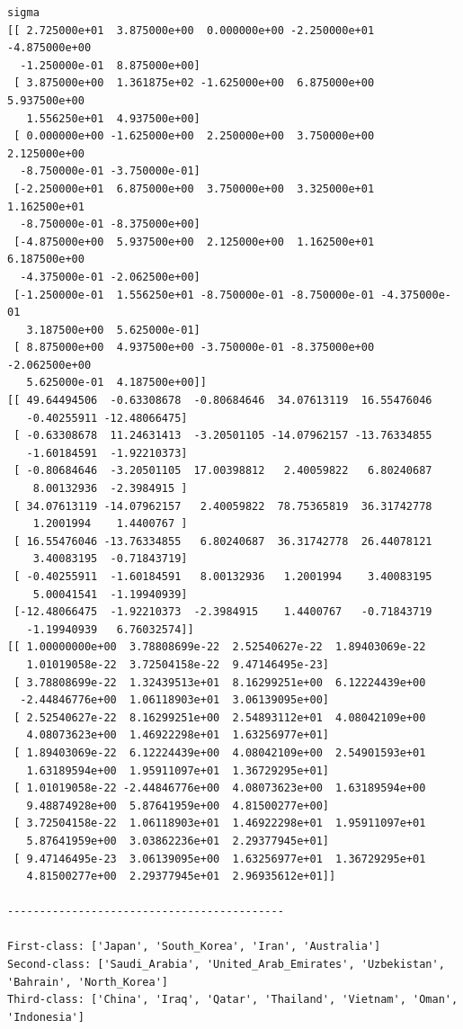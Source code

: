 \documentclass[a4paper, 11pt]{article}
\numberwithin{equation}{subsection}
\begin{document}
\begin{lstlisting}[language={}]
sigma
[[ 2.725000e+01  3.875000e+00  0.000000e+00 -2.250000e+01 -4.875000e+00
  -1.250000e-01  8.875000e+00]
 [ 3.875000e+00  1.361875e+02 -1.625000e+00  6.875000e+00  5.937500e+00
   1.556250e+01  4.937500e+00]
 [ 0.000000e+00 -1.625000e+00  2.250000e+00  3.750000e+00  2.125000e+00
  -8.750000e-01 -3.750000e-01]
 [-2.250000e+01  6.875000e+00  3.750000e+00  3.325000e+01  1.162500e+01
  -8.750000e-01 -8.375000e+00]
 [-4.875000e+00  5.937500e+00  2.125000e+00  1.162500e+01  6.187500e+00
  -4.375000e-01 -2.062500e+00]
 [-1.250000e-01  1.556250e+01 -8.750000e-01 -8.750000e-01 -4.375000e-01
   3.187500e+00  5.625000e-01]
 [ 8.875000e+00  4.937500e+00 -3.750000e-01 -8.375000e+00 -2.062500e+00
   5.625000e-01  4.187500e+00]]
[[ 49.64494506  -0.63308678  -0.80684646  34.07613119  16.55476046
   -0.40255911 -12.48066475]
 [ -0.63308678  11.24631413  -3.20501105 -14.07962157 -13.76334855
   -1.60184591  -1.92210373]
 [ -0.80684646  -3.20501105  17.00398812   2.40059822   6.80240687
    8.00132936  -2.3984915 ]
 [ 34.07613119 -14.07962157   2.40059822  78.75365819  36.31742778
    1.2001994    1.4400767 ]
 [ 16.55476046 -13.76334855   6.80240687  36.31742778  26.44078121
    3.40083195  -0.71843719]
 [ -0.40255911  -1.60184591   8.00132936   1.2001994    3.40083195
    5.00041541  -1.19940939]
 [-12.48066475  -1.92210373  -2.3984915    1.4400767   -0.71843719
   -1.19940939   6.76032574]]
[[ 1.00000000e+00  3.78808699e-22  2.52540627e-22  1.89403069e-22
   1.01019058e-22  3.72504158e-22  9.47146495e-23]
 [ 3.78808699e-22  1.32439513e+01  8.16299251e+00  6.12224439e+00
  -2.44846776e+00  1.06118903e+01  3.06139095e+00]
 [ 2.52540627e-22  8.16299251e+00  2.54893112e+01  4.08042109e+00
   4.08073623e+00  1.46922298e+01  1.63256977e+01]
 [ 1.89403069e-22  6.12224439e+00  4.08042109e+00  2.54901593e+01
   1.63189594e+00  1.95911097e+01  1.36729295e+01]
 [ 1.01019058e-22 -2.44846776e+00  4.08073623e+00  1.63189594e+00
   9.48874928e+00  5.87641959e+00  4.81500277e+00]
 [ 3.72504158e-22  1.06118903e+01  1.46922298e+01  1.95911097e+01
   5.87641959e+00  3.03862236e+01  2.29377945e+01]
 [ 9.47146495e-23  3.06139095e+00  1.63256977e+01  1.36729295e+01
   4.81500277e+00  2.29377945e+01  2.96935612e+01]]
   
-------------------------------------------

First-class: ['Japan', 'South_Korea', 'Iran', 'Australia']
Second-class: ['Saudi_Arabia', 'United_Arab_Emirates', 'Uzbekistan', 'Bahrain', 'North_Korea']
Third-class: ['China', 'Iraq', 'Qatar', 'Thailand', 'Vietnam', 'Oman', 'Indonesia']
\end{lstlisting}

%
%
\end{document}
